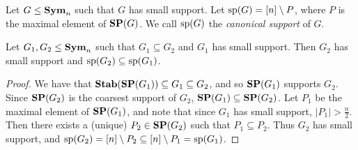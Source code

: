 \documentclass[../paper.tex]{subfiles}
\begin{document}
\begin{definition}
  Let $G \leq \text{\textbf{Sym}}_n$ such that $G$ has small support. Let $\text{sp}(G) = [n]
  \setminus P$, where $P$ is the maximal element of $\text{\textbf{SP}}(G)$. We call
  $\text{sp}(G)$ the \emph{canonical support} of $G$.
\end{definition}


\begin{lem}
  Let $G_1, G_2 \leq \text{\textbf{Sym}}_n$ such that $G_1 \subseteq G_2$ and $G_1$ has small
  support. Then $G_2$ has small support and $\text{sp}(G_2) \subseteq \text{sp}(G_1)$.
  \label{lem:support-containment}
\end{lem}
\begin{proof}
  We have that $\text{\textbf{Stab}}(\text{\textbf{SP}}(G_1)) \subseteq G_1 \subseteq G_2$, and so $\text{\textbf{SP}}(G_1)$
  supports $G_2$. Since $\text{\textbf{SP}}(G_2)$ is the coarsest support of $G_2$, $\text{\textbf{SP}}(G_1)
  \subseteq \text{\textbf{SP}}(G_2)$. Let $P_1$ be the maximal element of $\text{\textbf{SP}}(G_1)$, and note
  that since $G_1$ has small support, $\vert P_1 \vert > \frac{n}{2}$. Then
  there exists a (unique) $P_2 \in \text{\textbf{SP}}(G_2)$ such that $P_1 \subseteq P_2$. Thus
  $G_2$ has small support, and $\text{sp}(G_2) = [n] \setminus P_2 \subseteq [n]
  \setminus P_1 = \text{sp}(G_1)$.
\end{proof}
\end{document}
